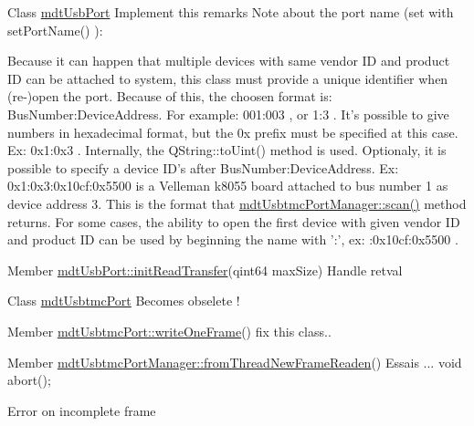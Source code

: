 \begin{DoxyDescription}
\item[Class \hyperlink{classmdt_usb_port}{mdtUsbPort} ]Implement this remarks Note about the port name (set with setPortName() ):\par
 Because it can happen that multiple devices with same vendor ID and product ID can be attached to system, this class must provide a unique identifier when (re-\/)open the port. Because of this, the choosen format is: BusNumber:DeviceAddress. For example: 001:003 , or 1:3 . It's possible to give numbers in hexadecimal format, but the 0x prefix must be specified at this case. Ex: 0x1:0x3 . Internally, the QString::toUint() method is used. Optionaly, it is possible to specify a device ID's after BusNumber:DeviceAddress. Ex: 0x1:0x3:0x10cf:0x5500 is a Velleman k8055 board attached to bus number 1 as device address 3. This is the format that \hyperlink{classmdt_usbtmc_port_manager_a992d1227810186d3c7dc166452e2e3b6}{mdtUsbtmcPortManager::scan()} method returns. For some cases, the ability to open the first device with given vendor ID and product ID can be used by beginning the name with ':', ex: :0x10cf:0x5500 . 
\end{DoxyDescription}

\label{todo__todo000037}
\hypertarget{todo__todo000037}{}
 
\begin{DoxyDescription}
\item[Member \hyperlink{classmdt_usb_port_a5e380852b8726f71e8558c86cba5bd1f}{mdtUsbPort::initReadTransfer}(qint64 maxSize) ]Handle retval 
\end{DoxyDescription}

\label{todo__todo000015}
\hypertarget{todo__todo000015}{}
 
\begin{DoxyDescription}
\item[Class \hyperlink{classmdt_usbtmc_port}{mdtUsbtmcPort} ]Becomes obselete ! 
\end{DoxyDescription}

\label{todo__todo000016}
\hypertarget{todo__todo000016}{}
 
\begin{DoxyDescription}
\item[Member \hyperlink{classmdt_usbtmc_port_a97fca5f136f232275d90ab5b8c5ce285}{mdtUsbtmcPort::writeOneFrame}() ]fix this class.. 
\end{DoxyDescription}

\label{todo__todo000046}
\hypertarget{todo__todo000046}{}
 
\begin{DoxyDescription}
\item[Member \hyperlink{classmdt_usbtmc_port_manager_aca42b343ae1f6a324e6e45968f03bbea}{mdtUsbtmcPortManager::fromThreadNewFrameReaden}() ]Essais ... void abort(); 

Error on incomplete frame 
\end{DoxyDescription}